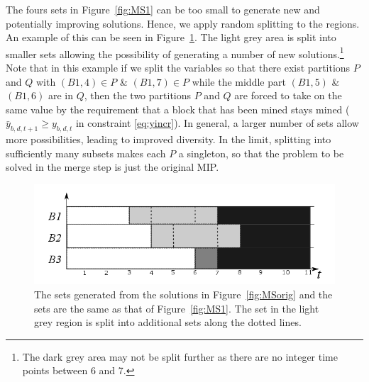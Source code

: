 \documentclass[authoryear,11pt,square,number,times,super,comma]{elsarticle}
\begin{document}
The fours sets in Figure~\ref{fig:MS1} can be too small to generate new and potentially improving solutions. Hence, we apply random splitting to the regions. An example of this can be seen in Figure~\ref{fig:MS2}. The light grey area is split into smaller sets allowing the possibility of generating a number of new solutions.\footnote{The dark grey area may not be split further as there are no integer time points between 6 and 7.}  Note that in this example if we split the variables so that there exist partitions $P$ and $Q$ with $(B1,4)\in P$ \& $(B1,7)\in P$ while the middle part $(B1,5)$ \& $(B1,6)$ are in $Q$, then the two partitions $P$ and $Q$ are forced to take on the same value by the requirement that a block that has been mined stays mined ($\bar y_{b,d,t+1}\ge y_{b,d,t}$ in constraint \eqref{eq:yincr}). In general, a larger number of sets allow more possibilities, leading to improved diversity. In the limit, splitting into sufficiently many subsets makes each $P$ a singleton, so that the problem to be solved in the merge step is just the original MIP.

\begin{figure}[h!]
  \includegraphics[width=14cm]{OPBS-MS2}
  \centering
  \caption{The sets generated from the solutions in Figure~\ref{fig:MSorig} and the sets are the same as that of Figure~\ref{fig:MS1}. The set in the light grey region is split into additional sets along the dotted lines. }
  \label{fig:MS2}
\end{figure}
\end{document}
